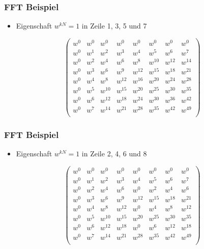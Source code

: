 \frame
{
	\frametitle{FFT Beispiel}
	\begin{itemize}
		\item Eigenschaft $w^{kN} = 1$ in Zeile 1, 3, 5 und 7
	\end{itemize}
	\vspace{1mm}
	\begin{equation*}
	\left( \begin{array}{cccccccc}
	w^{0} & w^{0} & w^{0} & w^{0} & w^{0} & w^{0} & w^{0} & w^{0}\\
	w^{0} & w^{1} & w^{2} & w^{3} & w^{4} & w^{5} & w^{6} & w^{7}\\
	w^{0} & w^{2} & w^{4} & w^{6} & w^{8} & w^{10} & w^{12} & w^{14}\\
	w^{0} & w^{3} & w^{6} & w^{9} & w^{12} & w^{15} & w^{18} & w^{21}\\
	w^{0} & w^{4} & w^{8} & w^{12} & w^{16} & w^{20} & w^{24} & w^{28}\\
	w^{0} & w^{5} & w^{10} & w^{15} & w^{20} & w^{25} & w^{30} & w^{35}\\
	w^{0} & w^{6} & w^{12} & w^{18} & w^{24} & w^{30} & w^{36} & w^{42}\\
	w^{0} & w^{7} & w^{14} & w^{21} & w^{28} & w^{35} & w^{42} & w^{49}\\
	\end{array} \right)
\end{equation*}
}

\frame
{
	\frametitle{FFT Beispiel}
	\begin{itemize}
		\item Eigenschaft $w^{kN} = 1$ in Zeile 2, 4, 6 und 8
	\end{itemize}
	\vspace{1mm}
	\begin{equation*}
	\left( \begin{array}{cccccccc}
	w^{0} & w^{0} & w^{0} & w^{0} & w^{0} & w^{0} & w^{0} & w^{0}\\
w^{0} & w^{1} & w^{2} & w^{3} & w^{4} & w^{5} & w^{6} & w^{7}\\
w^{0} & w^{2} & w^{4} & w^{6} & w^{0} & w^{2} & w^{4} & w^{6}\\
w^{0} & w^{3} & w^{6} & w^{9} & w^{12} & w^{15} & w^{18} & w^{21}\\
w^{0} & w^{4} & w^{8} & w^{12} & w^{0} & w^{4} & w^{8} & w^{12}\\
w^{0} & w^{5} & w^{10} & w^{15} & w^{20} & w^{25} & w^{30} & w^{35}\\
w^{0} & w^{6} & w^{12} & w^{18} & w^{0} & w^{6} & w^{12} & w^{18}\\
w^{0} & w^{7} & w^{14} & w^{21} & w^{28} & w^{35} & w^{42} & w^{49}\\
	\end{array} \right)
\end{equation*}
}


